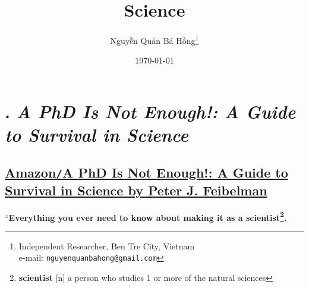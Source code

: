 \documentclass[oneside]{book}
\title{Science}
\author{\selectlanguage{vietnamese} Nguyễn Quản Bá Hồng\footnote{Independent Researcher, Ben Tre City, Vietnam\\e-mail: \texttt{nguyenquanbahong@gmail.com}}}
\date{\today}
\numberwithin{equation}{section}
\begin{document}
\maketitle
{}
\tableofcontents


\chapter{\cite{Feibelman2011}. \textit{A PhD Is Not Enough!: A Guide to Survival in Science}}

\section*{\href{https://www.amazon.com/PhD-Not-Enough-Survival-Science/dp/0465022227}{Amazon\texttt{/}A PhD Is Not Enough!: A Guide to Survival in Science by Peter J. Feibelman}}
``\textbf{Everything you ever need to know about making it as a scientist\footnote{\textbf{scientist} [n] a person who studies 1 or more of the natural sciences}.}
\end{document}
